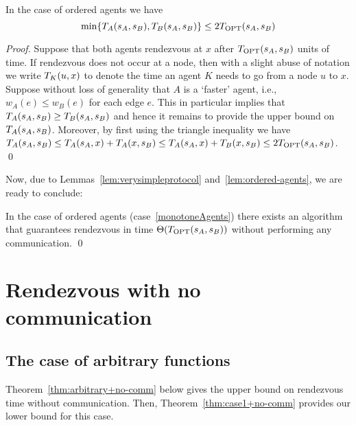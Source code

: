 \documentclass{llncs}
\newcommand{\Topt}[2]{T_{{\scriptsize \textup{OPT}}}(#1,#2)}
\newcommand{\dist}[4][]{\if!#1!T_{#2}(#3,#4)\else T_{#2}(#3,#4,#1)\fi}
\newcommand{\startpos}[1]{s_{#1}}
\newcommand{\starta}{\startpos{A}}
\newcommand{\startb}{\startpos{B}}
\newcommand{\agentVariable}{K}
\begin{document}
\begin{lemma} \label{lem:ordered-agents}
In the case of ordered agents we have
\[ \min \{ T_A(\starta,\startb), \dist{B}{\starta}{\startb} \} \leq 2 \Topt{\starta}{\startb}
\]
\end{lemma}	
\begin{proof}
Suppose that both agents rendezvous at $x$ after $\Topt{\starta}{\startb}$ units of time.
If rendezvous does not occur at a node, then with a slight abuse of notation we write $\dist{{\agentVariable}}{u}{x}$ to denote the time an agent ${\agentVariable}$ needs to go from a node $u$ to $x$. 
Suppose without loss of generality that $A$ is a `faster' agent, i.e., $w_A(e)\leq w_B(e)$ for each edge $e$.
This in particular implies that $\dist{A}{\starta}{\startb}\geq \dist{B}{\starta}{\startb}$ and hence it remains to provide the upper bound on $\dist{A}{\starta}{\startb}$.
Moreover, by first using the triangle inequality we have
$\dist{A}{\starta}{\startb} \leq T_A(\starta, x) + T_A(x, \startb) \leq T_A(\starta, x) + T_B(x, \startb) \leq 2\Topt{\starta}{\startb}$.
\qed\end{proof}

Now, due to Lemmas~\ref{lem:verysimpleprotocol} and~\ref{lem:ordered-agents}, we are ready to conclude:
\begin {theorem} \label{thm:orderedagents}
In the case of ordered agents (case~\ref{monotoneAgents}) there exists an algorithm that guarantees rendezvous in time $\Theta(\Topt{\starta}{\startb})$
without performing any communication. \qed
\end{theorem}


\section{Rendezvous with no communication}

\subsection{The case of arbitrary functions}
Theorem~\ref{thm:arbitrary+no-comm} below gives the upper bound on rendezvous time without communication.
Then, Theorem~\ref{thm:case1+no-comm} provides our lower bound for this case.
\end{document}
